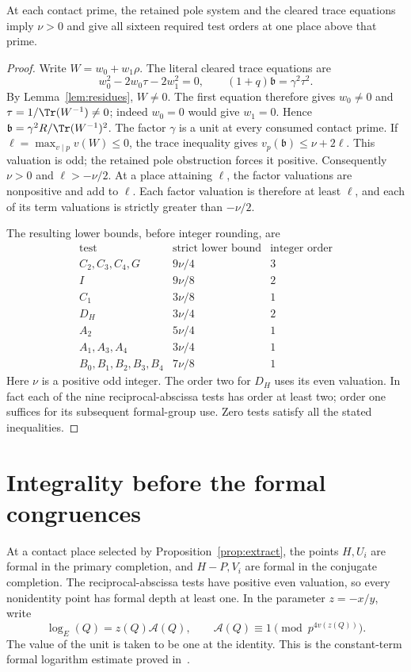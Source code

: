 \begin{proposition}\label{prop:extract}
At each contact prime, the retained pole system and the cleared trace
equations imply $\nu>0$ and give all sixteen required test orders at
one place above that prime.
\end{proposition}
\begin{proof}
Write $W=w_0+w_1\rho$. The literal cleared trace equations are
\[
 w_0^2-2w_0\tau-2w_1^2=0,\qquad (1+q)\mathfrak b=\gamma^2\tau^2.
\]
By Lemma~\ref{lem:residues}, $W\ne0$. The first equation therefore
gives $w_0\ne0$ and $\tau=1/\Tr(W^{-1})\ne0$; indeed $w_0=0$
would give $w_1=0$. Hence
$\mathfrak b=\gamma^2R/\Tr(W^{-1})^2$. The factor $\gamma$ is a unit at every consumed contact prime. If
$\ell=\max_{v\mid p}v(W)\le0$, the trace inequality gives
$v_p(\mathfrak b)\le\nu+2\ell$.
This valuation is odd; the retained pole obstruction forces it positive.
Consequently $\nu>0$ and $\ell>-\nu/2$.
At a place attaining $\ell$, the factor valuations are nonpositive
and add to $\ell$. Each factor valuation is therefore at least $\ell$,
and each of its term valuations is strictly greater than $-\nu/2$.

The resulting lower bounds, before integer rounding, are
\[
\begin{array}{c|c|c}
\text{test}&\text{strict lower bound}&\text{integer order}\\\hline
C_2,C_3,C_4,G&9\nu/4&3\\
I&9\nu/8&2\\
C_1&3\nu/8&1\\
D_H&3\nu/4&2\\
A_2&5\nu/4&1\\
A_1,A_3,A_4&3\nu/4&1\\
B_0,B_1,B_2,B_3,B_4&7\nu/8&1
\end{array}
\]
Here $\nu$ is a positive odd integer. The order two for $D_H$ uses
its even valuation. In fact each of the nine reciprocal-abscissa
tests has order at least two; order one suffices for its subsequent
formal-group use. Zero tests satisfy all the stated inequalities.
\end{proof}

\section{Integrality before the formal congruences}
At a contact place selected by Proposition~\ref{prop:extract}, the
points $H,U_i$ are formal in the primary completion, and $H-P,V_i$
are formal in the conjugate completion. The reciprocal-abscissa
tests have positive even valuation, so every nonidentity point has
formal depth at least one. In the parameter $z=-x/y$, write
\[
 \log_E(Q)=z(Q)\mathcal A(Q),\qquad
 \mathcal A(Q)\equiv1\pmod{p^{4v(z(Q))}}.
\]
The value of the unit is taken to be one at the identity. This is
the constant-term formal logarithm estimate proved in~\cite{Logs}.


